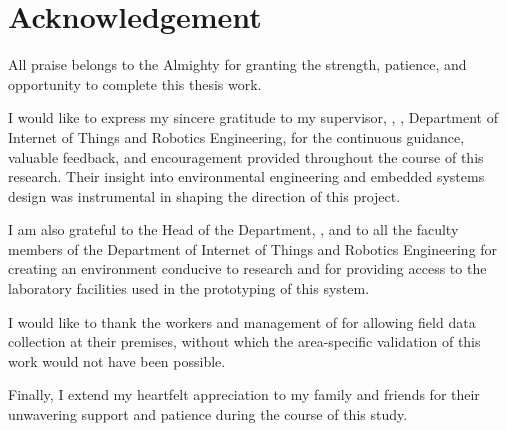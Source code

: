 \chapter*{Acknowledgement}

All praise belongs to the Almighty for granting the strength, patience, and opportunity to complete this thesis work.

I would like to express my sincere gratitude to my supervisor, , , Department of Internet of Things and Robotics Engineering, for the continuous guidance, valuable feedback, and encouragement provided throughout the course of this research. Their insight into environmental engineering and embedded systems design was instrumental in shaping the direction of this project.

I am also grateful to the Head of the Department, , and to all the faculty members of the Department of Internet of Things and Robotics Engineering for creating an environment conducive to research and for providing access to the laboratory facilities used in the prototyping of this system.

I would like to thank the workers and management of  for allowing field data collection at their premises, without which the area-specific validation of this work would not have been possible.

Finally, I extend my heartfelt appreciation to my family and friends for their unwavering support and patience during the course of this study.

\vspace{1cm}
\noindent {}
